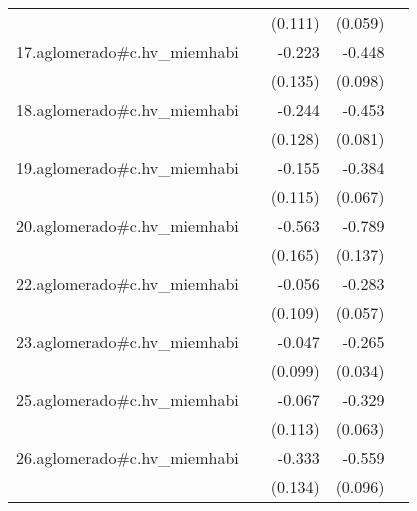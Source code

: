 {\begin{longtable}{l*{4}{D{.}{.}{-1}}}
            &                     &     (0.111)         &     (0.059)         &                     \\
\addlinespace
17.aglomerado#c.hv\_miemhabi&                     &      -0.223         &      -0.448\sym{***}&                     \\
            &                     &     (0.135)         &     (0.098)         &                     \\
\addlinespace
18.aglomerado#c.hv\_miemhabi&                     &      -0.244         &      -0.453\sym{***}&                     \\
            &                     &     (0.128)         &     (0.081)         &                     \\
\addlinespace
19.aglomerado#c.hv\_miemhabi&                     &      -0.155         &      -0.384\sym{***}&                     \\
            &                     &     (0.115)         &     (0.067)         &                     \\
\addlinespace
20.aglomerado#c.hv\_miemhabi&                     &      -0.563\sym{***}&      -0.789\sym{***}&                     \\
            &                     &     (0.165)         &     (0.137)         &                     \\
\addlinespace
22.aglomerado#c.hv\_miemhabi&                     &      -0.056         &      -0.283\sym{***}&                     \\
            &                     &     (0.109)         &     (0.057)         &                     \\
\addlinespace
23.aglomerado#c.hv\_miemhabi&                     &      -0.047         &      -0.265\sym{***}&                     \\
            &                     &     (0.099)         &     (0.034)         &                     \\
\addlinespace
25.aglomerado#c.hv\_miemhabi&                     &      -0.067         &      -0.329\sym{***}&                     \\
            &                     &     (0.113)         &     (0.063)         &                     \\
\addlinespace
26.aglomerado#c.hv\_miemhabi&                     &      -0.333\sym{*}  &      -0.559\sym{***}&                     \\
            &                     &     (0.134)         &     (0.096)         &                     \\

\end{longtable}}
